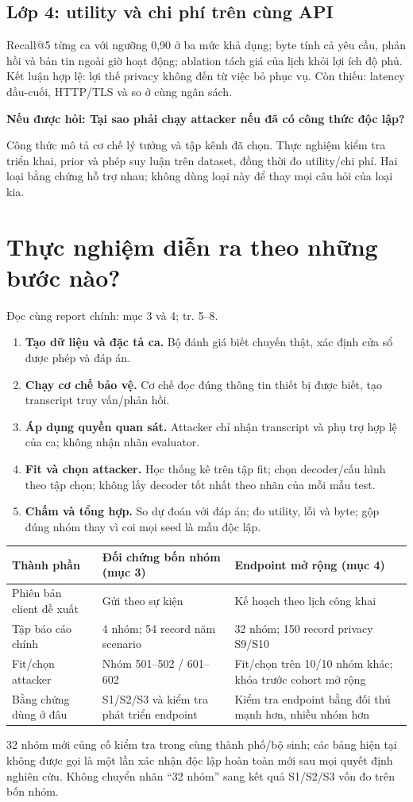 \documentclass[10pt,a4paper]{article}
\newcommand{\ask}[2]{\par\textbf{Nếu được hỏi: #1}\par #2\par}
\newcommand{\where}[1]{\par{\small\color{gray}Đọc cùng report chính: #1.}\par}
\newcommand{\guidepage}[1]{\clearpage\section{#1}}
\begin{document}
\subsection*{Lớp 4: utility và chi phí trên cùng API}
Recall@5 từng ca với ngưỡng 0,90 ở ba mức khả dụng; byte tính cả yêu cầu, phản hồi và bản tin ngoài giờ hoạt động; ablation tách giá của lịch khỏi lợi ích độ phủ. Kết luận hợp lệ: lợi thế privacy không đến từ việc bỏ phục vụ. Còn thiếu: latency đầu-cuối, HTTP/TLS và so ở cùng ngân sách.

\ask{Tại sao phải chạy attacker nếu đã có công thức độc lập?}{Công thức mô tả cơ chế lý tưởng và tập kênh đã chọn. Thực nghiệm kiểm tra triển khai, prior và phép suy luận trên dataset, đồng thời đo utility/chi phí. Hai loại bằng chứng hỗ trợ nhau; không dùng loại này để thay mọi câu hỏi của loại kia.}

\guidepage{Thực nghiệm diễn ra theo những bước nào?}
\where{mục 3 và 4; tr. 5--8}
\begin{enumerate}
\item \textbf{Tạo dữ liệu và đặc tả ca.} Bộ đánh giá biết chuyến thật, xác định cửa sổ được phép và đáp án.
\item \textbf{Chạy cơ chế bảo vệ.} Cơ chế đọc đúng thông tin thiết bị được biết, tạo transcript truy vấn/phản hồi.
\item \textbf{Áp dụng quyền quan sát.} Attacker chỉ nhận transcript và phụ trợ hợp lệ của ca; không nhận nhãn evaluator.
\item \textbf{Fit và chọn attacker.} Học thống kê trên tập fit; chọn decoder/cấu hình theo tập chọn; không lấy decoder tốt nhất theo nhãn của mỗi mẫu test.
\item \textbf{Chấm và tổng hợp.} So dự đoán với đáp án; đo utility, lỗi và byte; gộp đúng nhóm thay vì coi mọi seed là mẫu độc lập.
\end{enumerate}

\begin{longtable}{@{}P{4.0cm}P{6.0cm}P{6.2cm}@{}}
\toprule Thành phần & Đối chứng bốn nhóm (mục 3) & Endpoint mở rộng (mục 4)\\\midrule
Phiên bản client đề xuất & Gửi theo sự kiện & Kế hoạch theo lịch công khai\\[4pt]
Tập báo cáo chính & 4 nhóm; 54 record năm scenario & 32 nhóm; 150 record privacy S9/S10\\[4pt]
Fit/chọn attacker & Nhóm 501--502 / 601--602 & Fit/chọn trên 10/10 nhóm khác; khóa trước cohort mở rộng\\[4pt]
Bằng chứng dùng ở đâu & S1/S2/S3 và kiểm tra phát triển endpoint & Kiểm tra endpoint bằng đối thủ mạnh hơn, nhiều nhóm hơn\\
\bottomrule
\end{longtable}
32 nhóm mới củng cố kiểm tra trong cùng thành phố/bộ sinh; các bảng hiện tại không được gọi là một lần xác nhận độc lập hoàn toàn mới sau mọi quyết định nghiên cứu. Không chuyển nhãn ``32 nhóm'' sang kết quả S1/S2/S3 vốn đo trên bốn nhóm.
\end{document}
